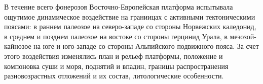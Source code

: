 В течение всего фонерозоя Восточно-Европейская платформа испытывала 
ощутимое динамическое воздействие на граниицах с активными тектоническими
поясами: в раннем палеозое на северо-западе со стороны Норвежских 
каледонид, в среднем и позднем палеозое на востоке со стороны герцинид 
Урала, в мезозой-кайнозое на юге и юго-западе со стороны Альпийского 
подвижного пояса. За счет этого воздействия изменялись план и рельеф платформы, 
положение и компоновка суши и моря, поднятий и впадин, границы распространения 
разновозрастных отложений и их состав, литологические особенности.